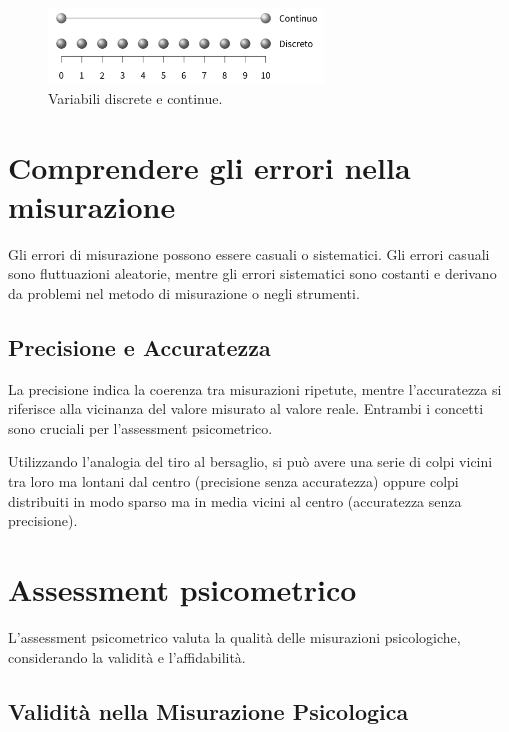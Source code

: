 \documentclass[
  letterpaper,
  DIV=11,
  numbers=noendperiod]{scrreprt}
\theoremstyle{definition}
\theoremstyle{remark}
\begin{document}
\begin{figure}[H]

{\centering \includegraphics[width=0.65\textwidth,height=\textheight]{chapters/key_notions/../../figures/misurazione_3.png}

}

\caption{Variabili discrete e continue.}

\end{figure}%

\section{Comprendere gli errori nella
misurazione}\label{comprendere-gli-errori-nella-misurazione}

Gli errori di misurazione possono essere casuali o sistematici. Gli
errori casuali sono fluttuazioni aleatorie, mentre gli errori
sistematici sono costanti e derivano da problemi nel metodo di
misurazione o negli strumenti.

\subsection{Precisione e Accuratezza}\label{precisione-e-accuratezza}

La precisione indica la coerenza tra misurazioni ripetute, mentre
l'accuratezza si riferisce alla vicinanza del valore misurato al valore
reale. Entrambi i concetti sono cruciali per l'assessment psicometrico.

Utilizzando l'analogia del tiro al bersaglio, si può avere una serie di
colpi vicini tra loro ma lontani dal centro (precisione senza
accuratezza) oppure colpi distribuiti in modo sparso ma in media vicini
al centro (accuratezza senza precisione).

\section{Assessment psicometrico}\label{assessment-psicometrico}

L'assessment psicometrico valuta la qualità delle misurazioni
psicologiche, considerando la validità e l'affidabilità.

\subsection{Validità nella Misurazione
Psicologica}\label{validituxe0-nella-misurazione-psicologica}
\end{document}
